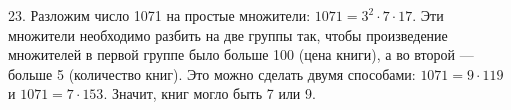 23. Разложим число 1071 на простые множители: $1071=3^2\cdot7\cdot17.$ Эти множители необходимо разбить на две группы так, чтобы произведение множителей в первой группе было больше 100 (цена книги), а во второй --- больше 5 (количество книг). Это можно сделать двумя способами: $1071=9\cdot119$ и $1071=7\cdot153.$ Значит, книг могло быть 7 или 9.\\
